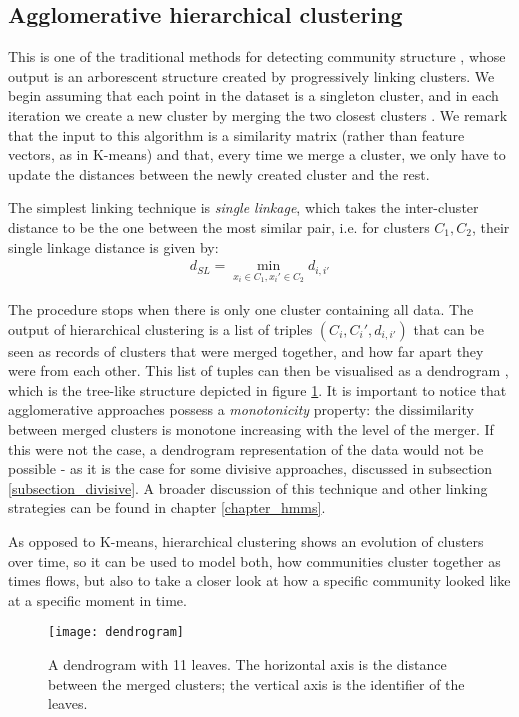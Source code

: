 \documentclass[../main.tex]{subfiles} \label{chapter_soa}
\begin{document}
\subsection{Agglomerative hierarchical clustering} \label{subsection_hier}
This is one of the traditional methods for detecting community structure \cite{Girvan2002}, whose output is an arborescent structure created by progressively linking clusters. We begin assuming that each point in the dataset is a singleton cluster, and in each iteration we create a new cluster by merging the two closest clusters \cite{hastie2008}. We remark that the input to this algorithm is a similarity matrix (rather than feature vectors, as in K-means) and that, every time we merge a cluster, we only have to update the distances between the newly created cluster and the rest. 
\par The simplest linking technique is \emph{single linkage}, which takes the inter-cluster distance to be the one between the most similar pair, i.e. for clusters $C_1, C_2$, their single linkage distance is given by:
\begin{align*}
d_{SL} = \min_{x_i\in C_1, x_i'\in C_2}{d_{i,i'}}
\end{align*}
\par The procedure stops when there is only one cluster containing all data. The output of hierarchical clustering is a list of triples $(C_i, C_i', d_{i,i'})$ that can be seen as records of clusters that were merged together, and how far apart they were from each other. This list of tuples can then be visualised as a dendrogram \cite{HAGMathworks}, which is the tree-like structure depicted in figure \ref{fig_hag}. It is important to notice that agglomerative approaches possess a \emph{monotonicity} property: the dissimilarity between merged clusters is monotone increasing with the level of the merger. If this were not the case, a dendrogram representation of the data would not be possible \cite{hastie2008} - as it is the case for some divisive approaches, discussed in subsection \ref{subsection_divisive}. A broader discussion of this technique and other linking strategies can be found in chapter \ref{chapter_hmms}.
\par As opposed to K-means, hierarchical clustering shows an evolution of clusters over time, so it can be used to model both, how communities cluster together as times flows, but also to take a closer look at how a specific community looked like at a specific moment in time.
\begin{figure}[t]
\centering
\texttt{[image: dendrogram]}
\caption{A dendrogram with 11 leaves. The horizontal axis is the distance between the merged clusters; the vertical axis is the identifier of the leaves.}
\label{fig_hag}
\end{figure}
\end{document}
